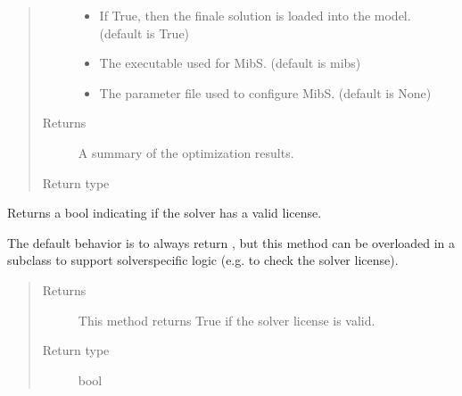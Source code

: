 \documentclass[letterpaper,10pt,english]{sphinxmanual}
\begin{document}
\begin{fulllineitems}
\begin{fulllineitems}
\begin{quote}
\begin{description}
\begin{itemize}
\item {} 
 \textendash{} If True, then the finale solution is loaded into the model. (default is True)

\item {} 
 \textendash{} The executable used for MibS.  (default is mibs)

\item {} 
 \textendash{} The parameter file used to configure MibS.  (default is None)

\end{itemize}

\item[{Returns}] \leavevmode
A summary of the optimization results.

\item[{Return type}] \leavevmode
{\hyperref[\detokenize{reference/solverapi:pao.common.solver.Results}]{}}

\end{description}\end{quote}

\end{fulllineitems}


\begin{fulllineitems}
\label{\detokenize{reference/mpr:pao.mpr.solvers.mibs.LinearMultilevelSolver_MIBS.valid_license}}
Returns a bool indicating if the solver has a valid license.

The default behavior is to always return , but this method
can be overloaded in a subclass to support solver\sphinxhyphen{}specific logic
(e.g.  to check the solver license).
\begin{quote}\begin{description}
\item[{Returns}] \leavevmode
This method returns True if the solver license is valid.

\item[{Return type}] \leavevmode
bool

\end{description}\end{quote}


\end{fulllineitems}
\end{fulllineitems}
\end{document}
